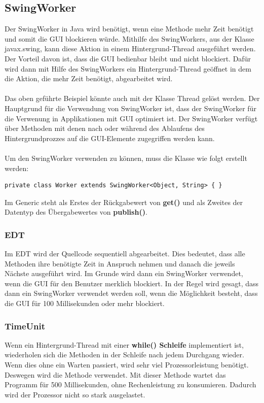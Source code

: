 \subsection{SwingWorker}
Der SwingWorker in Java wird benötigt, wenn eine Methode mehr Zeit benötigt und somit die GUI blockieren würde. Mithilfe des SwingWorkers, aus der Klasse javax.swing, kann diese Aktion in einem Hintergrund-Thread ausgeführt werden. Der Vorteil davon ist, dass die GUI bedienbar bleibt und nicht blockiert. Dafür wird dann mit Hilfe des SwingWorkers ein Hintergrund-Thread geöffnet in dem die Aktion, die mehr Zeit benötigt, abgearbeitet wird.
\\ \\
Das oben geführte Beispiel könnte auch mit der Klasse Thread gelöst werden. Der Hauptgrund für die Verwendung von SwingWorker ist, dass der SwingWorker für die Verwenung in Applikationen mit GUI optimiert ist. Der SwingWorker verfügt über Methoden mit denen nach oder während des Ablaufens des Hintergrundprozzes auf die GUI-Elemente zugegriffen werden kann.
\\ \\ 
Um den SwingWorker verwenden zu können, muss die Klasse wie folgt erstellt werden:
\begin{lstlisting}[style=JavaStyle, caption=SwingWorker Klasse erstellen]
	private class Worker extends SwingWorker<Object, String> { } 
\end{lstlisting}
Im Generic steht als Erstes der Rückgabewert von \textbf{get()} und als Zweites der Datentyp des Übergabewertes von \textbf{publish()}.

\subsubsection{EDT}
Im \ac{EDT} wird der Quellcode sequentiell abgearbeitet. Dies bedeutet, dass alle Methoden ihre benötigte Zeit in Anspruch nehmen und danach die jeweils Nächste ausgeführt wird. Im Grunde wird dann ein SwingWorker verwendet, wenn die GUI für den Benutzer merklich blockiert. In der Regel wird gesagt, dass dann ein SwingWorker verwendet werden soll, wenn die Möglichkeit besteht, dass die GUI für 100 Millisekunden oder mehr blockiert.

\subsubsection{TimeUnit}
Wenn ein Hintergrund-Thread mit einer \textbf{while() Schleife} implementiert ist, wiederholen sich die Methoden in der Schleife nach jedem Durchgang wieder. Wenn dies ohne ein Warten passiert, wird sehr viel Prozessorleistung benötigt. Deswegen wird die Methode  verwendet. Mit dieser Methode wartet das Programm für 500 Millisekunden, ohne Rechenleistung zu konsumieren. Dadurch wird der Prozessor nicht so stark ausgelastet. 

